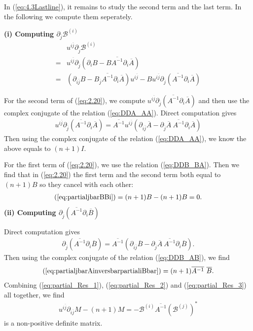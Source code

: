 \documentclass{article}
\numberwithin{equation}{section}
\newcommand{\ijbar}{{i\overline j}}
\newcommand{\partialijbar}{\partial_{i\overline j}}
\newcommand{\jbar}{{\overline{j}}}
\newcommand{\Abar}{{\overline{A}}}
\newcommand{\Bbar}{{\overline{B}}}
\newcommand{\Abarinverse}{\overline{A^{-1}}}
\newcommand{\Bjbar}{B_{\jbar}}
\newcommand{\BBi}{{\mathscr{B}^{(i)}}}
\newcommand{\BBj}{{\mathscr{B}^{(j)}}}
\newcommand{\BBjbar}{{\left(\BBj\right)^\ast}}
\newcommand{\partiali}{\partial_i}
\newcommand{\partialjbar}{\partial_{\overline j}}
\newcommand{\uijbar}{{u^{\ijbar}}}
\begin{document}
In (\ref{eq:4.3Lastline}), it remains to study the second term and the last term. In the following we compute them seperately.

{\bf(i) Computing $\partialjbar\BBi$}
\begin{align}
  &\uijbar\partialjbar\BBi
  \label{eq:partialjbarBBi}\\
=&\uijbar\partialjbar\left( \partiali B-B\Abarinverse\partiali\Abar\right)\\
=&
\left(\partialijbar B-\Bjbar\Abarinverse\partiali \Abar\right)\uijbar
-B\uijbar\partialjbar \left( \Abarinverse\partiali\Abar\right)
\label{eq:2.20}
\end{align}

For the second term of (\ref{eq:2.20}), we compute $\uijbar\partialjbar \left( \Abarinverse\partiali\Abar\right)$ and then use the complex conjugate of the relation (\ref{eq:DDA_AA}). Direct computation gives
\begin{align}
  \uijbar	\partialjbar \left( \Abarinverse\partiali\Abar\right)
=\Abarinverse\uijbar\left( \partialijbar \Abar-\partialjbar\Abar\ \Abarinverse\partiali\Abar\right)
\end{align}
Then using the complex conjugate of the relation (\ref{eq:DDA_AA}), we know the above equals to $(n+1)I$.

For the first term of (\ref{eq:2.20}), we use the relation (\ref{eq:DDB_BA}). Then we find that  in (\ref{eq:2.20}) the first term and the second term both equal to $(n+1)B$ so they cancel with each other:
\begin{align}
(\ref{eq:partialjbarBBi})=(n+1)B-(n+1)B=0.
\label{eq:partial_Res_2}
\end{align}
{\bf(ii) Computing $\partial_\jbar\left(\Abarinverse \partial_i\Bbar\right)$}

Direct computation gives
\begin{align}
	\partial_\jbar\left(\Abarinverse \partial_i\Bbar\right)
	=\Abarinverse \left(\partialijbar \Bbar -\partial_\jbar\Abar\ \Abarinverse\partiali\Bbar\right).
	\label{eq:partialjbarAinversbarpartialiBbar}
\end{align}
Then using the complex conjugate of the relation (\ref{eq:DDB_AB}), we find
\begin{align}
	(\ref{eq:partialjbarAinversbarpartialiBbar})=(n+1)\Abarinverse \ \Bbar.
	\label{eq:partial_Res_3}
\end{align}
Combining (\ref{eq:partial_Res_1}), (\ref{eq:partial_Res_2}) and (\ref{eq:partial_Res_3}) all together, we find
\begin{align}
\uijbar	\partialijbar M-(n+1)M=-\BBi\Abarinverse\BBjbar
\end{align}
is a non-positive definite matrix.
\end{document}
